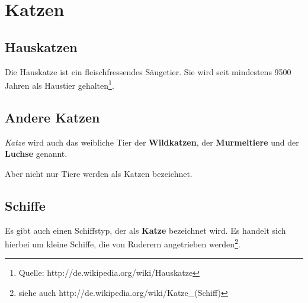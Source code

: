 
\section{Katzen}
\subsection{Hauskatzen}
Die Hauskatze ist ein fleischfressendes Säugetier. Sie wird seit mindestens 9500 Jahren als Haustier gehalten\footnote{Quelle: http://de.wikipedia.org/wiki/Hauskatze}.
\subsection{Andere Katzen}
\textit{Katze} wird auch das weibliche Tier der \textbf{Wildkatzen}, der \textbf{Murmeltiere} und der \textbf{Luchse} genannt.

Aber nicht nur Tiere werden als Katzen bezeichnet.
\subsection{Schiffe}
Es gibt auch einen Schiffstyp, der als \textbf{Katze} bezeichnet wird. Es handelt sich hierbei um \tiny kleine \normalsize Schiffe, die von Ruderern angetrieben werden\footnote{siehe auch http://de.wikipedia.org/wiki/Katze\_(Schiff)}.
